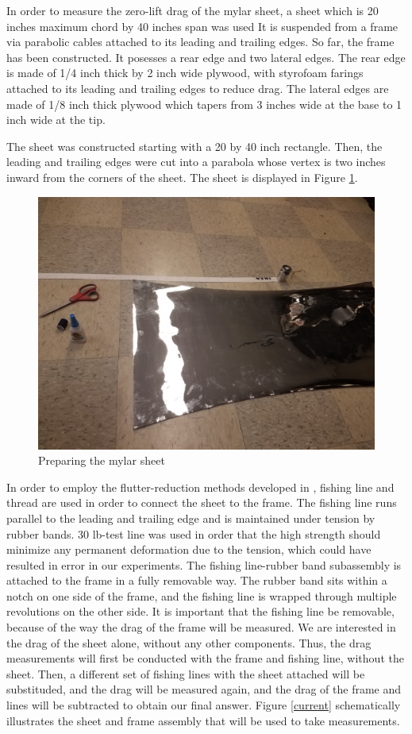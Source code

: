 \documentclass[12pt]{report} %
\begin{document}
In order to measure the zero-lift drag of the mylar sheet, a sheet which is 20 inches maximum chord by 40 inches span was used
It is suspended from a
frame via parabolic cables attached to its leading and trailing edges. So far, the frame has been constructed. It posesses a rear edge and two
lateral edges. The rear edge is made of 1/4 inch thick by 2 inch wide plywood, with styrofoam farings attached to its leading and trailing
edges to reduce drag. The lateral edges are made of 1/8 inch thick plywood which tapers from 3 inches wide at the base to 1 inch wide at the tip.

The sheet was constructed starting with a 20 by 40 inch rectangle. Then, the leading and trailing edges were cut into a parabola whose vertex
is two inches inward from the corners of the sheet. The sheet is displayed in Figure \ref{sheet_building}.

\begin{figure}
\includegraphics[width = 0.7\linewidth]{sheet_building.jpg}
\centering
\caption{Preparing the mylar sheet}
\label{sheet_building}
\end{figure}

In order to employ the flutter-reduction methods developed in \cite{us}, fishing line and thread are used in order to connect the sheet to
the frame. The fishing line runs parallel to the leading and trailing edge
and is maintained under tension by rubber bands. 30 lb-test line was used in order that the high strength should minimize any permanent deformation
due to the tension, which could have resulted in error in our experiments. The fishing line-rubber band subassembly is attached to the frame in a
fully removable way. The rubber band sits within a notch on one side of the frame, and the fishing line is wrapped through multiple revolutions
on the other side. It is important that the fishing line be removable, because of the way the drag of the frame will be measured. We are interested
in the drag of the sheet alone, without any other components. Thus, the drag measurements will first be conducted with the frame and fishing line,
without the sheet. Then, a different set of fishing lines with the sheet attached will be substituded, and the drag will be measured again, and
the drag of the frame and lines will be subtracted to obtain our final answer. Figure \ref{current} schematically illustrates the sheet and frame
assembly that will be used to take measurements.
\end{document}
